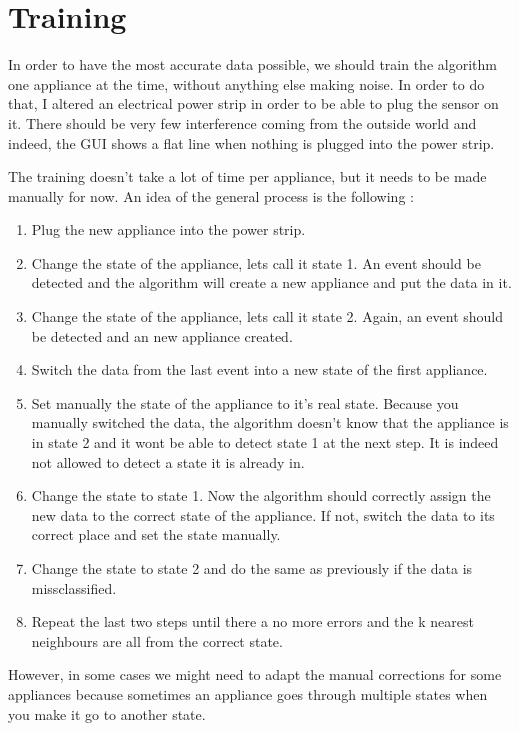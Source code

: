 \section{Training}
In order to have the most accurate data possible, we should train the algorithm one appliance at the time, without anything else making noise. In order to do that, I altered an electrical power strip in order to be able to plug the sensor on it. There should be very few interference coming from the outside world and indeed, the GUI shows a flat line when nothing is plugged into the power strip.

The training doesn't take a lot of time per appliance, but it needs to be made manually for now. An idea of the general process is the following :
\begin{enumerate}
    \item Plug the new appliance into the power strip.
    \item Change the state of the appliance, lets call it state 1. An event should be detected and the algorithm will create a new appliance and put the data in it.
    \item Change the state of the appliance, lets call it state 2. Again, an event should be detected and an new appliance created.
    \item Switch the data from the last event into a new state of the first appliance.
    \item Set manually the state of the appliance to it's real state. Because you manually switched the data, the algorithm doesn't know that the appliance is in state 2 and it wont be able to detect state 1 at the next step. It is indeed not allowed to detect a state it is already in.
    \item Change the state to state 1. Now the algorithm should correctly assign the new data to the correct state of the appliance. If not, switch the data to its correct place and set the state manually.
    \item Change the state to state 2 and do the same as previously if the data is missclassified.
    \item Repeat the last two steps until there a no more errors and the k nearest neighbours are all from the correct state.
\end{enumerate}

However, in some cases we might need to adapt the manual corrections for some appliances because sometimes an appliance goes through multiple states when you make it go to another state.

